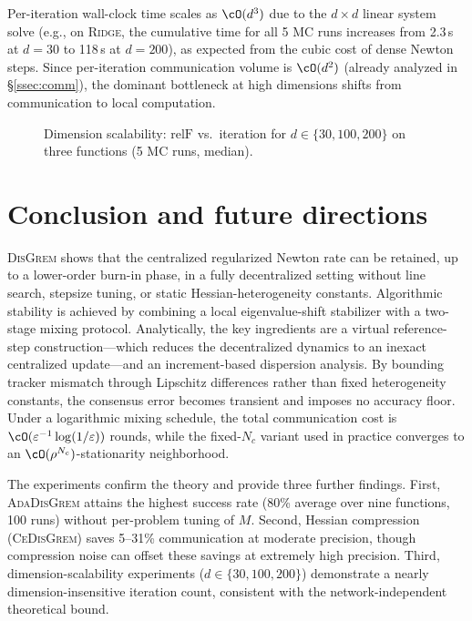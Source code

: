 \documentclass[review,onefignum,onetabnum]{siamart171218}
\begin{document}
	Per-iteration wall-clock time scales as $\cO(d^3)$ due to the
	$d\times d$ linear system solve (e.g., on \textsc{Ridge}, the cumulative
	time for all 5 MC runs increases from 2.3\,s at $d{=}30$ to 118\,s at $d{=}200$),
	as expected from the cubic cost of dense Newton steps.
	Since per-iteration communication volume is $\cO(d^2)$
	(already analyzed in \S\ref{ssec:comm}), the dominant bottleneck
	at high dimensions shifts from communication to local computation.

	\begin{figure}[htbp]
		\centering
		\caption{Dimension scalability: $\mathrm{relF}$ vs.\ iteration for
		$d\in\{30,100,200\}$ on three functions (5 MC runs, median).}
		\label{fig:scalability}
	\end{figure}
	
	
\section{Conclusion and future directions}\label{sec:conclusion}

	\textsc{DisGrem} shows that the centralized regularized Newton rate can
	be retained, up to a lower-order burn-in phase, in a fully decentralized
	setting without line search, stepsize tuning, or static
	Hessian-heterogeneity constants.
	Algorithmic stability is achieved by combining a local eigenvalue-shift
	stabilizer with a two-stage mixing protocol.
	Analytically, the key ingredients are a virtual reference-step
	construction---which reduces the decentralized dynamics to an inexact
	centralized update---and an increment-based dispersion analysis.
	By bounding tracker mismatch through Lipschitz differences rather than
	fixed heterogeneity constants, the consensus error becomes transient and
	imposes no accuracy floor.
	Under a logarithmic mixing schedule, the total communication cost
	is $\cO(\varepsilon^{-1}\log(1/\varepsilon))$ rounds, while the
	fixed-$N_c$ variant used in practice converges to an
	$\cO(\rho^{N_c})$-stationarity neighborhood.

	The experiments confirm the theory and provide three further findings. First, \textsc{AdaDisGrem} attains the highest success rate
	(80\% average over nine functions, 100 runs) without per-problem tuning
	of $M$. Second, Hessian compression (\textsc{CeDisGrem}) saves 5--31\%
	communication at moderate precision, though compression noise can offset
	these savings at extremely high precision. Third, dimension-scalability
	experiments ($d\in\{30,100,200\}$) demonstrate a nearly dimension-insensitive
	iteration count, consistent with the network-independent theoretical bound.
\end{document}
